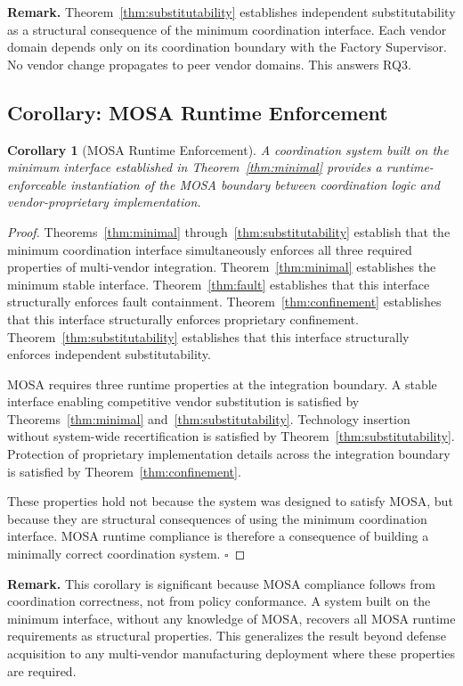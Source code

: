 \documentclass[a4paper,fleqn]{cas-dc}
\newtheorem{corollary}{Corollary}
\begin{document}
\noindent\textbf{Remark.} Theorem~\ref{thm:substitutability} establishes independent substitutability as a structural consequence of the minimum coordination interface. Each vendor domain depends only on its coordination boundary with the Factory Supervisor. No vendor change propagates to peer vendor domains. This answers RQ3.

\subsection{Corollary: MOSA Runtime Enforcement}

\begin{corollary}[MOSA Runtime Enforcement]
\label{cor:mosa}
A coordination system built on the minimum interface established in Theorem~\ref{thm:minimal} provides a runtime-enforceable instantiation of the MOSA boundary between coordination logic and vendor-proprietary implementation.
\end{corollary}

\begin{proof}
Theorems~\ref{thm:minimal} through~\ref{thm:substitutability} establish that the minimum coordination interface simultaneously enforces all three required properties of multi-vendor integration. Theorem~\ref{thm:minimal} establishes the minimum stable interface. Theorem~\ref{thm:fault} establishes that this interface structurally enforces fault containment. Theorem~\ref{thm:confinement} establishes that this interface structurally enforces proprietary confinement. Theorem~\ref{thm:substitutability} establishes that this interface structurally enforces independent substitutability.

MOSA requires three runtime properties at the integration boundary. A stable interface enabling competitive vendor substitution is satisfied by Theorems~\ref{thm:minimal} and~\ref{thm:substitutability}. Technology insertion without system-wide recertification is satisfied by Theorem~\ref{thm:substitutability}. Protection of proprietary implementation details across the integration boundary is satisfied by Theorem~\ref{thm:confinement}.

These properties hold not because the system was designed to satisfy MOSA, but because they are structural consequences of using the minimum coordination interface. MOSA runtime compliance is therefore a consequence of building a minimally correct coordination system. \hfill$\square$
\end{proof}

\noindent\textbf{Remark.} This corollary is significant because MOSA compliance follows from coordination correctness, not from policy conformance. A system built on the minimum interface, without any knowledge of MOSA, recovers all MOSA runtime requirements as structural properties. This generalizes the result beyond defense acquisition to any multi-vendor manufacturing deployment where these properties are required.
\end{document}
